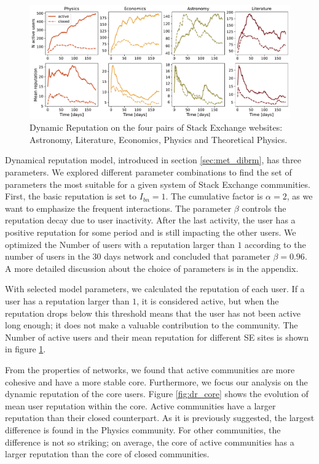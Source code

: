 \begin{figure}[h]
	\centering
	\includegraphics[width=\linewidth]{figures/stackexchange/reputation.pdf}
	\caption[Dynamic Reputation of Stack Exchange websites.]{Dynamic Reputation on the four pairs of Stack Exchange websites: Astronomy, Literature, Economics,  Physics and Theoretical Physics.}
	\label{fig:dr6panel}
\end{figure}

Dynamical reputation model, introduced in section \ref{sec:met_dibrm}, has three parameters. We explored different parameter combinations to find the set of parameters the most suitable for a given system of Stack Exchange communities. First, the basic reputation is set to $I_{bn}=1$. The cumulative factor is $\alpha=2$, as we want to emphasize the frequent interactions. The parameter $\beta$ controls the reputation decay due to user inactivity. After the last activity, the user has a positive reputation for some period and is still impacting the other users. We optimized the Number of users with a reputation larger than $1$ according to the number of users in the 30 days network and concluded that parameter $\beta=0.96$. A more detailed discussion about the choice of parameters is in the appendix. 

With selected model parameters, we calculated the reputation of each user. If a user has a reputation larger than $1$, it is considered active, but when the reputation drops below this threshold means that the user has not been active long enough; it does not make a valuable contribution to the community. The Number of active users and their mean reputation for different SE sites is shown in figure \ref{fig:dr6panel}. 

From the properties of networks, we found that active communities are more cohesive and have a more stable core. Furthermore, we focus our analysis on the dynamic reputation of the core users. Figure \ref{fig:dr_core} shows the evolution of mean user reputation within the core. Active communities have a larger reputation than their closed counterpart. As it is previously suggested, the largest difference is found in the Physics community. For other communities, the difference is not so striking; on average, the core of active communities has a larger reputation than the core of closed communities. 

